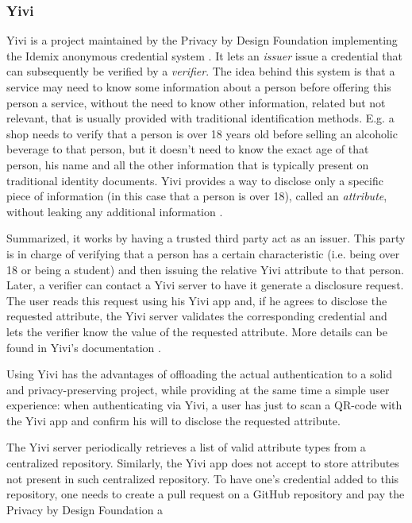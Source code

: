 \documentclass{report}
\begin{document}
\subsubsection{Yivi} \label{yivi}
Yivi is a project maintained by the Privacy by Design Foundation \cite{privacybydesignfoundation} implementing the Idemix anonymous credential system \cite{idemix_specification}. It
lets an \textit{issuer} issue a credential that can subsequently be verified by a \textit{verifier}. The idea behind this system is that a service may need to know some
information about a person before offering this person a service, without the need to know other information, related but not relevant, that is usually provided with traditional
identification methods. E.g. a shop needs to verify that a person is over 18 years old before selling an alcoholic beverage to that person, but it doesn't need to know the exact age of
that person, his name and all the other information that is typically present on traditional identity documents. Yivi provides a way to disclose only a specific piece of
information (in this case that a person is over 18), called an \textit{attribute}, without leaking any additional information \cite{irma-docs}. \par
Summarized, it works by having a trusted third party act as an issuer. This party is in charge of verifying that a person has a certain characteristic (i.e. being over 18 or being
a student) and then issuing the relative Yivi attribute to that person. Later, a verifier can contact a Yivi server to have it generate a disclosure request. The user reads this
request using his Yivi app and, if he agrees to disclose the requested attribute, the Yivi server validates the corresponding credential and lets the verifier know the value of the
requested attribute. More details can be found in Yivi's documentation \cite{irma-docs}. \par
Using Yivi has the advantages of offloading the actual authentication to a solid and privacy-preserving project, while providing at the same time a simple user experience: when
authenticating via Yivi, a user has just to scan a QR-code with the Yivi app and confirm his will to disclose the requested attribute. \par
The Yivi server periodically retrieves a list of valid attribute types from a centralized repository. Similarly, the Yivi app does not accept to store attributes not present in such
centralized repository. To have one's credential added to this repository, one needs to create a pull request on a GitHub repository and pay the Privacy by Design Foundation a
\end{document}

